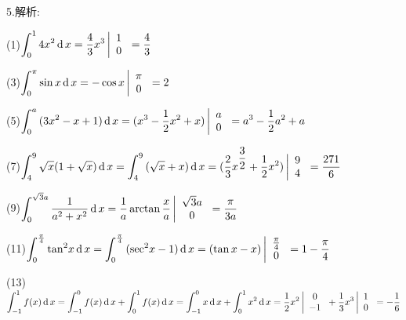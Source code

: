 5.解析:

(1)$\displaystyle\int_0^1 {4{x^2}} \rd x = \frac{4}{3}{x^3}\left| {\begin{array}{*{20}{c}}
  1 \\
  0
\end{array}} \right. = \dfrac{4}{3}$

(3)$\displaystyle\int_0^\pi  {\sin x\rd x}  =  - \cos x\left| {\begin{array}{*{20}{c}}
  \pi  \\
  0
\end{array}} \right. = 2$

(5)$\displaystyle\int_0^a {(3{x^2}}  - x + 1)\rd x = ({x^3} - \dfrac{1}{2}{x^2} + x)\left| {\begin{array}{*{20}{c}}
  a \\
  0
\end{array}} \right. = {a^3} - \dfrac{1}{2}{a^2} + a$

(7)$\displaystyle\int_4^9 {\sqrt x } (1 + \sqrt x )\rd x = \displaystyle\int_4^9 {(\sqrt x  + x} )\rd x = (\dfrac{2}{3}{x^{\dfrac{3}{2}}} + \dfrac{1}{2}{x^2})\left| {\begin{array}{*{20}{c}}
  9 \\
  4
\end{array}} \right. = \dfrac{{271}}{6}$

(9)$\displaystyle\int_0^{\sqrt 3 a} {\dfrac{1}{{{a^2} + {x^2}}}} \rd x = \dfrac{1}{a}\arctan \dfrac{x}{a}\left| {\begin{array}{*{20}{c}}
  {\sqrt 3 a} \\
  0
\end{array}} \right. = \dfrac{\pi }{{3a}}$

(11)$\displaystyle\int_0^{\frac{\pi }{4}} {{{\tan }^2}} x\rd x = \displaystyle\int_0^{\frac{\pi }{4}} {({{\sec }^2}x - 1} )\rd x = (\tan x - x)\left| {\begin{array}{*{20}{c}}
  {\frac{\pi }{4}} \\
  0
\end{array}} \right. = 1 - \dfrac{\pi }{4}$

(13)$\displaystyle\int_{ - 1}^1 {f(x)\rd x}  = \displaystyle\int_{ - 1}^0 {f(x)\rd x + \displaystyle\int_0^1 {f(x)\rd x} }  = \displaystyle\int_{ - 1}^0 {x\rd x + \displaystyle\int_0^1 {{x^2}\rd x} }  = \dfrac{1}{2}{x^2}\left| {\begin{array}{*{20}{c}}
  0 \\
  { - 1}
\end{array}} \right. + \dfrac{1}{3}{x^3}\left| {\begin{array}{*{20}{c}}
  1 \\
  0
\end{array}} \right. =  - \dfrac{1}{6}$

